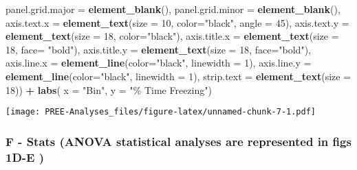 \documentclass[
]{article}
\newenvironment{Shaded}{\begin{snugshade}}{\end{snugshade}}
\newcommand{\AttributeTok}[1]{\textcolor[rgb]{0.13,0.29,0.53}{#1}}
\newcommand{\DecValTok}[1]{\textcolor[rgb]{0.00,0.00,0.81}{#1}}
\newcommand{\FunctionTok}[1]{\textcolor[rgb]{0.13,0.29,0.53}{\textbf{#1}}}
\newcommand{\NormalTok}[1]{#1}
\newcommand{\SpecialCharTok}[1]{\textcolor[rgb]{0.81,0.36,0.00}{\textbf{#1}}}
\newcommand{\StringTok}[1]{\textcolor[rgb]{0.31,0.60,0.02}{#1}}
\begin{document}
\begin{Shaded}
\begin{Highlighting}[]
        \AttributeTok{panel.grid.major =} \FunctionTok{element\_blank}\NormalTok{(),}
        \AttributeTok{panel.grid.minor =} \FunctionTok{element\_blank}\NormalTok{(),}
        \AttributeTok{axis.text.x =} \FunctionTok{element\_text}\NormalTok{(}\AttributeTok{size =} \DecValTok{10}\NormalTok{, }\AttributeTok{color=}\StringTok{"black"}\NormalTok{, }\AttributeTok{angle =} \DecValTok{45}\NormalTok{),}
        \AttributeTok{axis.text.y =} \FunctionTok{element\_text}\NormalTok{(}\AttributeTok{size =} \DecValTok{18}\NormalTok{, }\AttributeTok{color=}\StringTok{"black"}\NormalTok{),}
        \AttributeTok{axis.title.x =} \FunctionTok{element\_text}\NormalTok{(}\AttributeTok{size =} \DecValTok{18}\NormalTok{, }\AttributeTok{face=} \StringTok{"bold"}\NormalTok{),}
        \AttributeTok{axis.title.y =} \FunctionTok{element\_text}\NormalTok{(}\AttributeTok{size =} \DecValTok{18}\NormalTok{, }\AttributeTok{face=}\StringTok{"bold"}\NormalTok{),}
        \AttributeTok{axis.line.x =} \FunctionTok{element\_line}\NormalTok{(}\AttributeTok{color=}\StringTok{"black"}\NormalTok{, }\AttributeTok{linewidth =} \DecValTok{1}\NormalTok{),}
        \AttributeTok{axis.line.y =} \FunctionTok{element\_line}\NormalTok{(}\AttributeTok{color=}\StringTok{"black"}\NormalTok{, }\AttributeTok{linewidth =} \DecValTok{1}\NormalTok{),}
        \AttributeTok{strip.text =} \FunctionTok{element\_text}\NormalTok{(}\AttributeTok{size =} \DecValTok{18}\NormalTok{)) }\SpecialCharTok{+} 
  \FunctionTok{labs}\NormalTok{(}
    \AttributeTok{x =} \StringTok{"Bin"}\NormalTok{,}
    \AttributeTok{y =} \StringTok{"\% Time Freezing"}\NormalTok{)}
\end{Highlighting}
\end{Shaded}

\texttt{[image: PREE-Analyses\_files/figure-latex/unnamed-chunk-7-1.pdf]}

\hypertarget{f---stats-anova-statistical-analyses-are-represented-in-figs-1d-e}{%
\subsubsection{F - Stats (ANOVA statistical analyses are represented in
figs 1D-E
)}\label{f---stats-anova-statistical-analyses-are-represented-in-figs-1d-e}}
\end{document}
